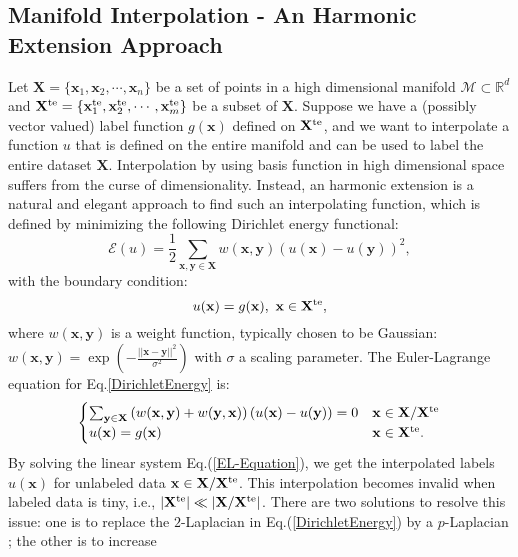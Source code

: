 \documentclass{article}
\begin{document}
\subsection{Manifold Interpolation - An Harmonic Extension Approach}
Let $\mathbf{X} = \{\mathbf{x}_1, \mathbf{x}_2, \cdots, \mathbf{x}_n\}$ be a set of points in a high dimensional manifold $\mathcal{M}\subset\mathbb{R}^d$ and $\mathbf{X}^{\rm te} = \{\mathbf{x}^{\rm te}_1, \mathbf{x}^{\rm te}_2, \cdots, \mathbf{x}^{\rm te}_m\}$ be a subset of $\mathbf{X}$. Suppose we have a (possibly vector valued) label function $g(\mathbf{x})$ defined on $\mathbf{X}^{\rm te}$, and we want to interpolate a function $u$ that is defined on the entire manifold and can be used to label the entire dataset $\mathbf{X}$. Interpolation by using basis function in high dimensional space suffers from the curse of dimensionality. Instead, an harmonic extension is a natural and elegant approach to find such an interpolating function, which is defined by minimizing the following Dirichlet energy functional:
\begin{equation}
\label{DirichletEnergy}
\mathcal{E}(u)=\frac{1}{2}\sum_{\mathbf{x}, \mathbf{y}\in \mathbf{X}} w(\mathbf{x}, \mathbf{y})\left(u(\mathbf{x})-u(\mathbf{y})\right)^2,
\end{equation}
with the boundary condition:
$$
u(\mathbf{x})=g(\mathbf{x}), \ \mathbf{x}\in \mathbf{X}^{\rm te},
$$
where $w(\mathbf{x}, \mathbf{y})$ is a weight function, typically chosen to be Gaussian: $w(\mathbf{x}, \mathbf{y})=\exp(-\frac{||\mathbf{x}-\mathbf{y}||^2}{\sigma^2})$ with $\sigma$ a scaling parameter. The Euler-Lagrange equation for Eq.\eqref{DirichletEnergy} is:
\begin{equation}
\label{EL-Equation}
\begin{cases}
\sum_{\mathbf{y}\in \mathbf{X}} \left(w(\mathbf{x}, \mathbf{y})+w(\mathbf{y}, \mathbf{x})\right)\left(u(\mathbf{x})-u(\mathbf{y})\right)=0 & \mathbf{x}\in \mathbf{X}/\mathbf{X}^{\rm te}\\
u(\mathbf{x})=g(\mathbf{x}) &\mathbf{x}\in \mathbf{X}^{\rm te}.
\end{cases}
\end{equation}
By solving the linear system Eq.(\ref{EL-Equation}), we get the interpolated labels $u(\mathbf{x})$ for unlabeled data $\mathbf{x}\in \mathbf{X}/\mathbf{X}^{\rm te}$. This interpolation becomes invalid when labeled data is tiny, i.e., $|\mathbf{X}^{\rm te}|\ll |\mathbf{X}
/\mathbf{X}^{\rm te}|$. There are two solutions to resolve this issue: one is to replace the $2$-Laplacian in Eq.(\ref{DirichletEnergy}) by a $p$-Laplacian \cite{Calder:2018}; the other is to increase 
\end{document}
